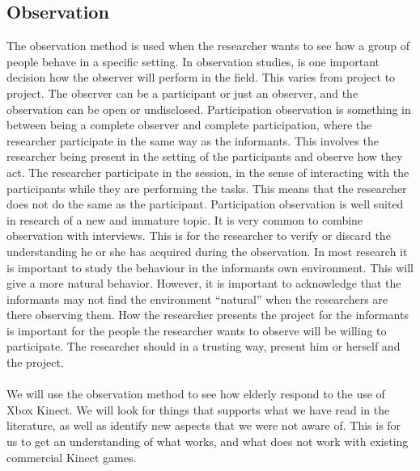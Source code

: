 \subsection{Observation}
The observation method is used when the researcher wants to see how a group of people behave in a specific setting. In observation studies, is one important decision how the observer will perform in the field. This varies from project to project. The observer can be a participant or just an observer, and the observation can be open or undisclosed. Participation observation is something in between being a complete observer and complete participation, where the researcher participate in the same way as the informants. This involves the researcher being present in the setting of the participants and observe how they act. The researcher participate in the session, in the sense of interacting with the participants while they are performing the tasks. This means that the researcher does not do the same as the participant. Participation observation is well suited in research of a new and immature topic. It is very common to combine observation with interviews. This is for the researcher to verify or discard the understanding he or she has acquired during the observation. In most research it is important to study the behaviour in the informants own environment. This will give a more natural behavior. However, it is important to acknowledge that the informants may not find the environment “natural” when the researchers are there observing them. How the researcher presents the project for the informants is important for the people the researcher wants to observe will be willing to participate. The researcher should in a trusting way, present him or herself and the project.\\ \\
We will use the observation method to see how elderly respond to the use of Xbox Kinect. We will look for things that supports what we have read in the literature, as well as identify new aspects that we were not aware of. This is for us to get an understanding of what works, and what does not work with existing commercial Kinect games.
